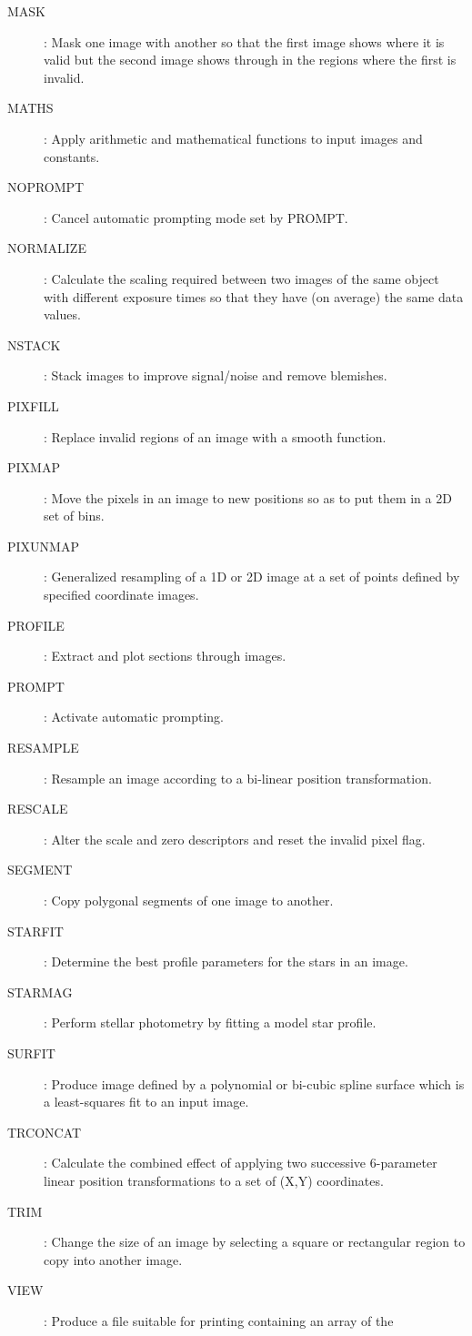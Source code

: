 \begin{description}
\item [MASK]: Mask one image with another so that the first image shows where
it is valid but the second image shows through in the regions where the first
is invalid.
\item [MATHS]: Apply arithmetic and mathematical functions to input images and
constants.
\item [NOPROMPT]: Cancel automatic prompting mode set by PROMPT.
\item [NORMALIZE]: Calculate the scaling required between two images of the
same object with different exposure times so that they have (on average) the
same data values.
\item [NSTACK]: Stack images to improve signal/noise and remove blemishes.
\item [PIXFILL]: Replace invalid regions of an image with a smooth function.
\item [PIXMAP]: Move the pixels in an image to new positions so as to put them
in a 2D set of bins.
\item [PIXUNMAP]: Generalized resampling of a 1D or 2D image at a set of points
defined by specified coordinate images.
\item [PROFILE]: Extract and plot sections through images.
\item [PROMPT]: Activate automatic prompting.
\item [RESAMPLE]: Resample an image according to a bi-linear position
transformation.
\item [RESCALE]: Alter the scale and zero descriptors and reset the invalid
pixel flag.
\item [SEGMENT]: Copy polygonal segments of one image to another.
\item [STARFIT]: Determine the best profile parameters for the stars in an
image.
\item [STARMAG]: Perform stellar photometry by fitting a model star profile.
\item [SURFIT]: Produce image defined by a polynomial or bi-cubic spline surface
which is a least-squares fit to an input image.
\item [TRCONCAT]: Calculate the combined effect of applying two successive
6-parameter linear position transformations to a set of (X,Y) coordinates.
\item [TRIM]: Change the size of an image by selecting a square or rectangular
region to copy into another image.
\item [VIEW]: Produce a file suitable for printing containing an array of the

\end{description}
